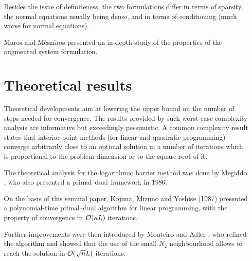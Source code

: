Besides the issue of definiteness, the two formulations differ in
terms of sparsity, the normal equations usually being dense, and
in terms of conditioning (much worse for normal equations).


Maros and M\'esz\'aros \cite{MarosMeszaros} presented an in-depth 
study of the properties of the augmented system formulation.

%
%
\section{Theoretical results}
\label{sec:TheoreticalResults}

Theoretical developments aim at lowering the upper bound on the number 
of steps needed for convergence. The results provided by such worst-case 
complexity analysis
are informative but exceedingly pessimistic. A common complexity result 
states that interior point methods (for linear and quadratic programming) 
converge arbitrarily close to an optimal solution in a number of iterations 
which is proportional to the problem dimension or to the square root of it.


The theoretical analysis for the logarithmic barrier method was
done by Megiddo \cite{Megiddo}, who also presented a primal--dual
framework in 1986. 

On the basis of this seminal paper, Kojima, Mizuno and Yoshise (1987) 
presented a polynomial-time primal--dual algorithm for linear programming, 
with the property of convergence in $\mathcal{O}(nL)$ iterations.

Further improvements were then introduced by Monteiro and Adler 
\cite{MonteiroAdler89a}, who refined the algorithm and showed that 
the use of the small $N_2$ neighbourhood allows to reach the solution 
in $\mathcal{O}(\sqrt{n}L)$ iterations.

